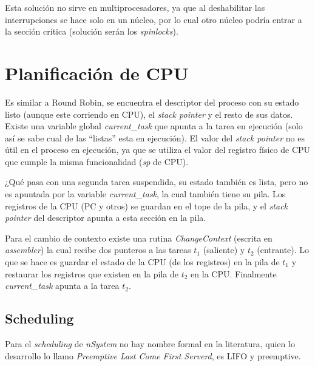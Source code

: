 Esta solución no sirve en multiprocesadores, ya que al deshabilitar las interrupciones se hace solo en un núcleo, por lo cual otro núcleo podría entrar a la sección crítica (solución serán los \textit{spinlocks}).



\section{Planificación de CPU}
Es similar a Round Robin, se encuentra el descriptor del proceso con su estado listo (aunque este corriendo en CPU), el \textit{stack pointer} y el resto de sus datos. Existe una variable global \textit{current\_task} que apunta a la tarea en ejecución (solo así se sabe cual de las ``listas'' esta en ejecución). El valor del \textit{stack pointer} no es útil en el proceso en ejecución, ya que se utiliza el valor del registro físico de CPU que cumple la misma funcionalidad (\textit{sp} de CPU).

¿Qué pasa con una segunda tarea suspendida, su estado también es lista, pero no es apuntada por la variable \textit{current\_task}, la cual también tiene su pila. Los registros de la CPU (PC y otros) se guardan en el tope de la pila, y el \textit{stack pointer} del descriptor apunta a esta sección en la pila.

Para el cambio de contexto existe una rutina \textit{ChangeContext} (escrita en \textit{assembler}) la cual recibe dos punteros a las tareas $t_1$ (saliente) y $t_2$ (entrante). Lo que se hace es guardar el estado de la CPU (de los registros) en la pila de $t_1$ y restaurar los registros que existen en la pila de $t_2$ en la CPU. Finalmente \textit{current\_task} apunta a la tarea $t_2$.

\subsection{Scheduling}
Para el \textit{scheduling} de \textit{nSystem} no hay nombre formal en la literatura, quien lo desarrollo lo llamo \textit{Preemptive Last Come First Serverd}, es LIFO y preemptive.

